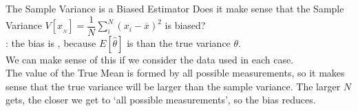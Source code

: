 \documentclass[10pt,sans,english,compress,xcolor=dvipsnames]{beamer}
\begin{document}
\begin{frame}{The Sample Variance is a Biased Estimator}
\footnotesize
Does it make sense that the Sample Variance $V[x_{_{N}}] = \dfrac{1}{N} \sum\limits_i^N (x_i-\overline{x})^2$ is biased?\\[1ex]

 : the bias is , because $E[\hat{\theta}]$ is  than the true variance $\theta$.\magt{*}\\[1ex]
 
 We can make sense of this if we consider the data used in each case. \\[1ex]
 
The value of the True Mean is formed by all possible measurements, so it makes sense that the true variance will be larger than the sample variance. The larger $N$ gets, the closer we get to `all possible measurements', so the bias reduces.\\[1ex] 

\notsotiny
{}

\end{frame}

%
%
%
%
%
\end{document}

